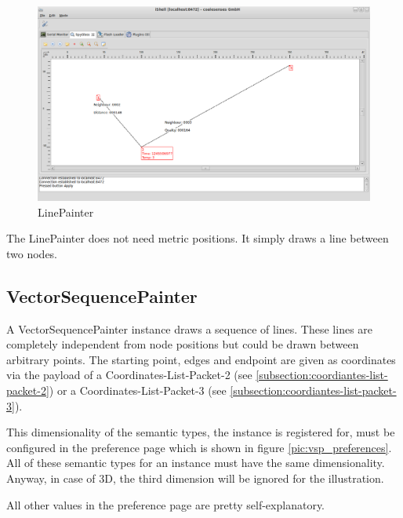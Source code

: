 \begin{figure}[htb]
  \begin{center}
    \includegraphics[width=13.2cm]{./pics/linepainter}
    \caption{LinePainter}
    \label{pic:lp}
  \end{center}
\end{figure}

The LinePainter does not need metric positions. It simply draws a line between two nodes.

\subsection{VectorSequencePainter}

A VectorSequencePainter instance draws a sequence of lines. These lines are completely independent from
node positions but could be drawn between arbitrary points. The starting point, edges and endpoint are given
as coordinates via the payload of a Coordinates-List-Packet-2 (see \ref{subsection:coordiantes-list-packet-2}) or
a Coordinates-List-Packet-3 (see \ref{subsection:coordiantes-list-packet-3}).

This dimensionality of the semantic types, the instance is registered for, must be configured in the preference page
which is shown in figure \ref{pic:vsp_preferences}. All of these semantic types for an instance must have
the same dimensionality. Anyway, in case of 3D, the third dimension will be ignored for the illustration.

All other values in the preference page are pretty self-explanatory.

